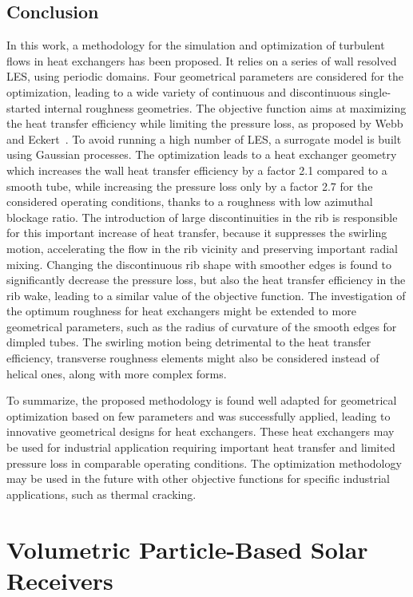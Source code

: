 \section{Conclusion}\label{sec:optim_ccl}
In this work, a methodology for the simulation and optimization of turbulent flows in heat exchangers has been proposed. It relies on a series of wall resolved LES, using periodic domains. Four geometrical parameters are considered for the optimization, leading to a wide variety of continuous and discontinuous single-started internal roughness geometries. The objective function aims at maximizing the heat transfer efficiency while limiting the pressure loss, as proposed by Webb and Eckert~\cite{webb1972}. To avoid running a high number of LES, a surrogate model is built using Gaussian processes. The optimization leads to a heat exchanger geometry which increases the wall heat transfer efficiency by a factor 2.1 compared to a smooth tube, while increasing the pressure loss only by a factor 2.7 for the considered operating conditions, thanks to a roughness with low azimuthal blockage ratio. The introduction of large discontinuities in the rib is responsible for this important increase of heat transfer, because it suppresses the swirling motion, accelerating the flow in the rib vicinity and preserving important radial mixing. Changing the discontinuous rib shape with smoother edges is found to significantly decrease the pressure loss, but also the heat transfer efficiency in the rib wake, leading to a similar value of the objective function. The investigation of the optimum roughness for heat exchangers might be extended to more geometrical parameters, such as the radius of curvature of the smooth edges for dimpled tubes. The swirling motion being detrimental to the heat transfer efficiency, transverse roughness elements might also be considered instead of helical ones, along with more complex forms.

To summarize, the proposed methodology is found well adapted for geometrical optimization based on few parameters and was successfully applied, leading to innovative geometrical designs for heat exchangers. These heat exchangers may be used for industrial application requiring important heat transfer and limited pressure loss in comparable operating conditions. The optimization methodology may be used in the future with other objective functions for specific industrial applications, such as thermal cracking.

\chapter{Volumetric Particle-Based Solar Receivers}\label{chap:psaap}

